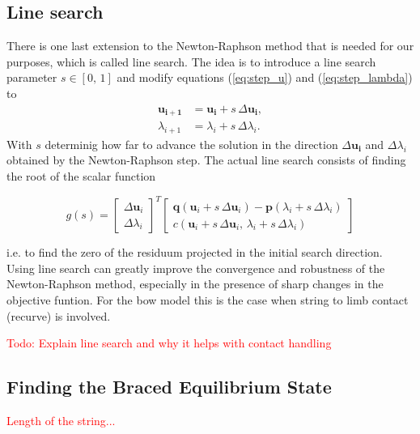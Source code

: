 \subsection{Line search}

There is one last extension to the Newton-Raphson method that is needed for our purposes, which is called line search. The idea is to introduce a line search parameter $s \in [0,\,1]$ and modify equations (\ref{eq:step_u}) and (\ref{eq:step_lambda}) to
%
\begin{align}
\boldsymbol{u_{i+1}} &= \boldsymbol{u_{i}} + s\,\Delta\boldsymbol{u_{i}},\\
\lambda_{i+1} &= \lambda_{i} + s\,\Delta \lambda_{i}.
\end{align}
%
With $s$ determinig how far to advance the solution in the direction $\Delta\boldsymbol{u_{i}}$ and $\Delta \lambda_{i}$ obtained by the Newton-Raphson step. The actual line search consists of finding the root of the scalar function

\begin{equation}
g(s) =
\begin{bmatrix}
\Delta \boldsymbol{u}_i \\ \Delta \lambda_i
\end{bmatrix}^T
\begin{bmatrix}
\boldsymbol{q}(\boldsymbol{u}_i + s\,\Delta \boldsymbol{u}_i) - \boldsymbol{p}(\lambda_i + s\,\Delta \lambda_i) \\ c(\boldsymbol{u}_i + s\,\Delta \boldsymbol{u}_i,\,\lambda_i + s\,\Delta \lambda_i)
\end{bmatrix}\label{eq:line_search_function}
\end{equation}

i.e. to find the zero of the residuum projected in the initial search direction. Using line search can greatly improve the convergence and robustness of the Newton-Raphson method, especially in the presence of sharp changes in the objective funtion. For the bow model this is the case when string to limb contact (recurve) is involved.

\textcolor{red}{Todo: Explain line search and why it helps with contact handling}


\newpage
\subsection{Finding the Braced Equilibrium State}

\textcolor{red}{Length of the string...}

